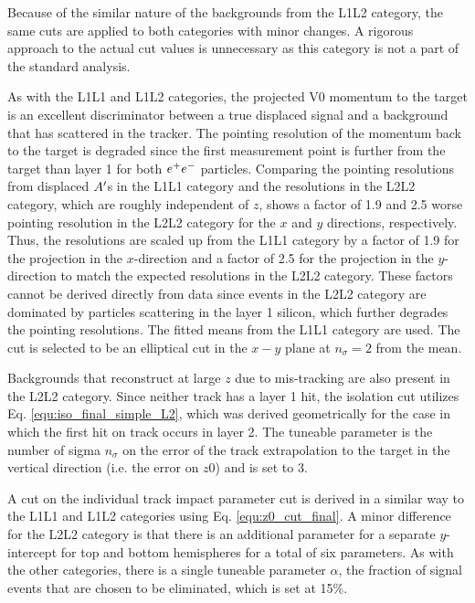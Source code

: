 Because of the similar nature of the backgrounds from the L1L2 category, the same cuts are applied to both categories with minor changes. A rigorous approach to the actual cut values is unnecessary as this category is not a part of the standard analysis.

As with the L1L1 and L1L2 categories, the projected V0 momentum to the target is an excellent discriminator between a true displaced signal and a background that has scattered in the tracker. The pointing resolution of the momentum back to the target is degraded since the first measurement point is further from the target than layer 1 for both $e^{+}e^{-}$ particles. Comparing the pointing resolutions from displaced $A^\prime$s in the L1L1 category and the resolutions in the L2L2 category, which are roughly independent of $z$, shows a factor of 1.9 and 2.5 worse pointing resolution in the L2L2 category for the $x$ and $y$ directions, respectively. Thus, the resolutions are scaled up from the L1L1 category by a factor of 1.9 for the projection in the $x$-direction and a factor of 2.5 for the projection in the $y$-direction to match the expected resolutions in the L2L2 category. These factors cannot be derived directly from data since events in the L2L2 category are dominated by particles scattering in the layer 1 silicon, which further degrades the pointing resolutions. The fitted means from the L1L1 category are used. The cut is selected to be an elliptical cut in the $x-y$ plane at $n_{\sigma}=2$ from the mean.

Backgrounds that reconstruct at large $z$ due to mis-tracking are also present in the L2L2 category. Since neither track has a layer 1 hit, the isolation cut utilizes Eq. \ref{equ:iso_final_simple_L2}, which was derived geometrically for the case in which the first hit on track occurs in layer 2. The tuneable parameter is the number of sigma $n_{\sigma}$ on the error of the track extrapolation to the target in the vertical direction (i.e. the error on $z0$) and is set to 3.

A cut on the individual track impact parameter cut is derived in a similar way to the L1L1 and L1L2 categories using Eq. \ref{equ:z0_cut_final}. A minor difference for the L2L2 category is that there is an additional parameter for a separate $y$-intercept for top and bottom hemispheres for a total of six parameters. As with the other categories, there is a single tuneable parameter $\alpha$, the fraction of signal events that are chosen to be eliminated, which is set at 15\%.

